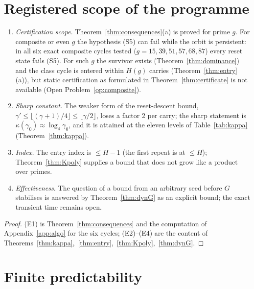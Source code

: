 \section{Registered scope of the programme}

\begin{theorem}\label{thm:T73}
\begin{enumerate}[label=(E\arabic*),nosep]
\item \emph{Certification scope.} Theorem~\ref{thm:consequences}(a) is proved for prime \(g\). For composite or even \(g\) the hypothesis (S5) can fail while the orbit is persistent: in all six exact composite cycles tested (\(g=15,39,51,57,68,87\)) every reset state fails (S5). For such \(g\) the survivor exists (Theorem~\ref{thm:dominance}) and the class cycle is entered within \(H(g)\) carries (Theorem~\ref{thm:entry}(a)), but static certification as formulated in Theorem~\ref{thm:certificate} is not available (Open Problem~\ref{op:composite}).
\item \emph{Sharp constant.} The weaker form of the reset-descent bound, \(\gamma'\le\lfloor(\gamma+1)/4\rfloor\le\lfloor\gamma/2\rfloor\), loses a factor 2 per carry; the sharp statement is \(\kappa(\gamma_0)\approx\log_4\gamma_0\), and it is attained at the eleven levels of Table~\ref{tab:kappa} (Theorem~\ref{thm:kappa}).
\item \emph{Index.} The entry index is \(\le H-1\) (the first repeat is at \(\le H\)); Theorem~\ref{thm:Kpoly} supplies a bound that does not grow like a product over primes.
\item \emph{Effectiveness.} The question of a bound from an arbitrary seed before \(G\) stabilises is answered by Theorem~\ref{thm:dynG} as an explicit bound; the exact transient time remains open.
\end{enumerate}
\end{theorem}
\begin{proof}
(E1) is Theorem~\ref{thm:consequences} and the computation of Appendix~\ref{app:algo} for the six cycles; (E2)--(E4) are the content of Theorems~\ref{thm:kappa},~\ref{thm:entry},~\ref{thm:Kpoly},~\ref{thm:dynG}.
\end{proof}

\section{Finite predictability}

